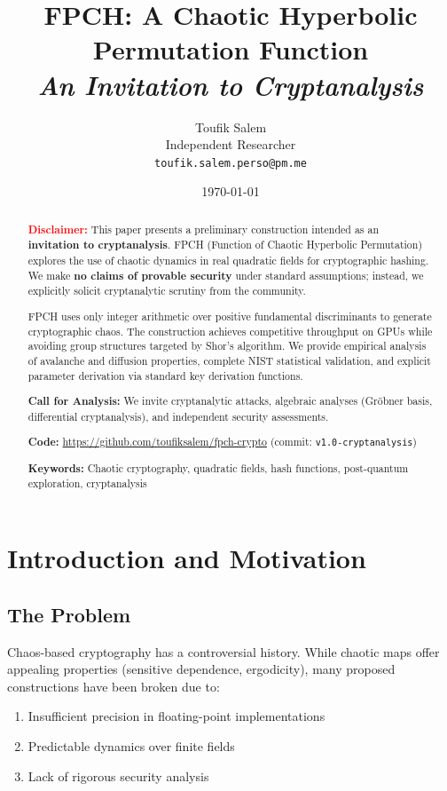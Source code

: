 \documentclass[11pt,a4paper]{article}
\title{\textbf{FPCH: A Chaotic Hyperbolic Permutation Function}\\\textit{An Invitation to Cryptanalysis}}
\author{Toufik Salem\\\small Independent Researcher\\\small \texttt{toufik.salem.perso@pm.me}}
\date{\today}
\theoremstyle{plain}
\theoremstyle{definition}
\theoremstyle{remark}
\begin{document}
\maketitle

\begin{abstract}
\noindent\textcolor{red}{\textbf{Disclaimer:}} This paper presents a preliminary construction intended as an \textbf{invitation to cryptanalysis}. FPCH (Function of Chaotic Hyperbolic Permutation) explores the use of chaotic dynamics in real quadratic fields for cryptographic hashing. We make \textbf{no claims of provable security} under standard assumptions; instead, we explicitly solicit cryptanalytic scrutiny from the community.

FPCH uses only integer arithmetic over positive fundamental discriminants to generate cryptographic chaos. The construction achieves competitive throughput on GPUs while avoiding group structures targeted by Shor's algorithm. We provide empirical analysis of avalanche and diffusion properties, complete NIST statistical validation, and explicit parameter derivation via standard key derivation functions.

\textbf{Call for Analysis:} We invite cryptanalytic attacks, algebraic analyses (Gr\"obner basis, differential cryptanalysis), and independent security assessments.

\textbf{Code:} \url{https://github.com/toufiksalem/fpch-crypto} (commit: \texttt{v1.0-cryptanalysis})

\textbf{Keywords:} Chaotic cryptography, quadratic fields, hash functions, post-quantum exploration, cryptanalysis
\end{abstract}

\section{Introduction and Motivation}

\subsection{The Problem}

Chaos-based cryptography has a controversial history. While chaotic maps offer appealing properties (sensitive dependence, ergodicity), many proposed constructions have been broken due to:
\begin{enumerate}
    \item Insufficient precision in floating-point implementations \cite{alvarez2006}
    \item Predictable dynamics over finite fields \cite{li2003}
    \item Lack of rigorous security analysis \cite{alvarez2006}
\end{enumerate}
\end{document}
